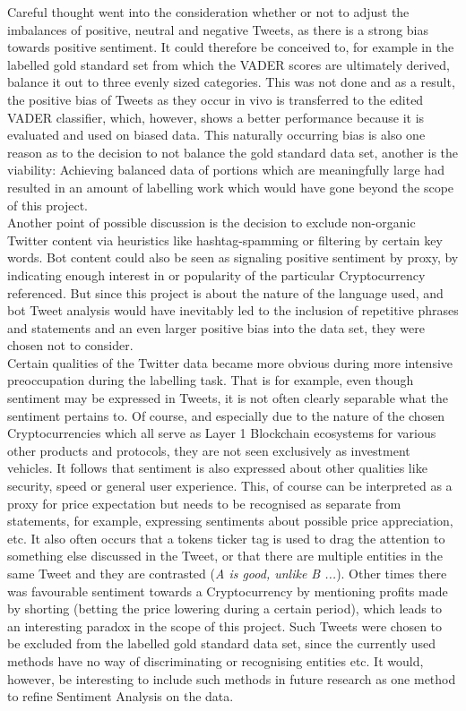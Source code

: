 \documentclass[11pt]{article}
\begin{document}
Careful thought went into the consideration whether or not to adjust the imbalances of positive, neutral and negative Tweets, as there is a strong bias towards positive sentiment. It could therefore be conceived to, for example in the labelled gold standard set from which the VADER scores are ultimately derived, balance it out to three evenly sized categories. This was not done and as a result, the positive bias of Tweets as they occur in vivo is transferred to the edited VADER classifier, which, however, shows a better performance because it is evaluated and used on biased data. This naturally occurring bias is also one reason as to the decision to not balance the gold standard data set, another is the viability: Achieving balanced data of portions which are meaningfully large had resulted in an amount of labelling work which would have gone beyond the scope of this project. \\
Another point of possible discussion is the decision to exclude non-organic Twitter content via heuristics like hashtag-spamming or filtering by certain key words. Bot content could also be seen as signaling positive sentiment by proxy, by indicating enough interest in or popularity of the particular Cryptocurrency referenced. But since this project is about the nature of the language used, and bot Tweet analysis would have inevitably led to the inclusion of repetitive phrases and statements and an even larger positive bias into the data set, they were chosen not to consider. \\
Certain qualities of the Twitter data became more obvious during more intensive preoccupation during the labelling task. That is for example, even though sentiment may be expressed in Tweets, it is not often clearly separable what the sentiment pertains to. Of course, and especially due to the nature of the chosen Cryptocurrencies which all serve as Layer 1 Blockchain ecosystems for various other products and protocols, they are not seen exclusively as investment vehicles. It follows that sentiment is also expressed about other qualities like security, speed or general user experience. This, of course can be interpreted as a proxy for price expectation but needs to be recognised as separate from statements, for example, expressing sentiments about possible price appreciation, etc. It also often occurs that a tokens ticker tag is used to drag the attention to something else discussed in the Tweet, or that there are multiple entities in the same Tweet and they are contrasted (\textit{A is good, unlike B ...}). Other times there was favourable sentiment towards a Cryptocurrency by mentioning profits made by shorting (betting the price lowering during a certain period), which leads to an interesting paradox in the scope of this project. Such Tweets were chosen to be excluded from the labelled gold standard data set, since the currently used methods have no way of discriminating or recognising entities etc. It would, however, be interesting to include such methods in future research as one method to refine Sentiment Analysis on the data. \\
\end{document}
